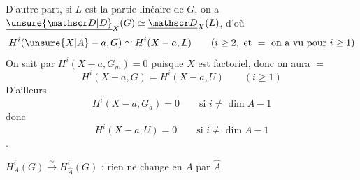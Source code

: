 D'autre part,  si $L$ est la partie linéaire de $G$, on a  $\underline{\unsure{\mathscr D|D}}_X(G)\simeq\underline{\mathscr D}_X(L)$, d'où
\[
H^i(\unsure{X|A}-a,G)\simeq H^i(X-a,L)\qquad(i\geq2,\text{ et }=\text{ on a vu pour }i\geq1)
\]
On sait par  $H^i(X-a,G_m)=0$ puisque $X$ est factoriel, donc on aura $=$
\[
H^i(X-a,G)=H^i(X-a,U)\qquad(i\geq1)
\]
 D'ailleurs 
\[
H^i(X-a,G_a)=0\qquad\text{si }i\neq\dim A-1
\]
donc
\[
H^i(X-a,U)=0\qquad\text{si }i\neq\dim A-1
\]
.

 $H_A^i(G)\xrightarrow{\sim}H_{\widehat A}^i(G)$ : rien ne change en  $A$ par $\widehat A$.

